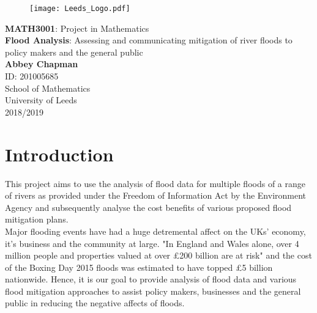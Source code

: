 \documentclass[11 pt, a4paper]{article}
\begin{document}
\begin{titlepage}
\begin{center}

\begin{figure}[H]
\centering
\texttt{[image: Leeds\_Logo.pdf]}
\end{figure}

\vspace{4cm}
{\LARGE \textbf{MATH3001}: Project in Mathematics}\\

\vspace{1cm}
{\Huge \textbf{Flood Analysis}: Assessing and communicating mitigation of river floods to policy makers and the general public}\\
\vspace{5cm}
\textbf{Abbey Chapman}\\
ID: 201005685\\
\vfill
School of Mathematics\\
University of Leeds\\
2018/2019
\end{center}
\end{titlepage}

\tableofcontents 
\noindent \hrulefill

\newpage
\section{Introduction}
This project aims to use the analysis of flood data for multiple floods of a range of rivers as provided under the Freedom of Information Act by the Environment Agency and subsequently analyse the cost benefits of various proposed flood mitigation plans. \\
Major flooding events have had a huge detremental affect on the UKs' economy, it's business and the community at large. "In England and Wales alone, over 4 million people and properties valued at over £200 billion are at risk"\cite{1} and the cost of the Boxing Day 2015 floods was estimated to have topped \pounds5 billion nationwide\cite{2}. Hence, it is our goal to provide analysis of flood data and various flood mitigation approaches to assist policy makers, businesses and the general public in reducing the negative affects of floods.\\
\end{document}
